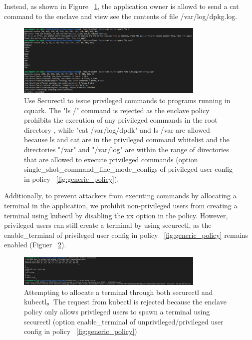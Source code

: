 Instead, as shown in Figure ~\ref{fig:cuqark_privileged_user_cat_allowed}, the application owner is allowd to send a cat command to the enclave and view see the contents of file /var/log/dpkg.log.

\begin{figure}[H]
    \centering
    \includegraphics[width=0.8\textwidth]{images/cuqark_privileged_user_cat_allowed.png}
    \caption[Use Securectl to issue privileged commands to programs running in cquark]{Use Securectl to issue privileged commands to programs running in cquark.  The "ls /" command is rejected as the enclave policy prohibits the execution of any privileged commands in the root directory 
    , while "cat /var/log/dpdk" and ls /var are allowed because ls and cat are in the privileged command whitelist and the directories "/var" and "/var/log" are within the range of directories that are allowed to execute privileged commands (option single\_shot\_command\_line\_mode\_configs of 
    privileged user config in policy ~\ref{fig:generic_policy}).}
    \label{fig:cuqark_privileged_user_cat_allowed}
\end{figure}


Additionally, to prevent attackers from executing commands by allocating a terminal in the application, we prohibit non-privileged users from creating a terminal using kubectl by disabling the xx option in the policy. However, privileged users can still create a terminal by using securectl, 
as the enable\_terminal of privileged user config in policy ~\ref{fig:generic_policy} remains enabled (Figuer ~\ref{fig:cquark_terminal}).

\begin{figure}[H]
    \centering
    \includegraphics[width=0.8\textwidth]{images/cquark_terminal.png}
    \caption[Attempting to allocate a terminal through both securectl and kubectl]{Attempting to allocate a terminal through both securectl and kubectl。The request from kubectl is rejected because the enclave policy only allows privileged users to spawn a terminal using securectl 
    (option enable\_terminal of unprivileged/privileged user config in policy ~\ref{fig:generic_policy})}
    \label{fig:cquark_terminal}
\end{figure}

